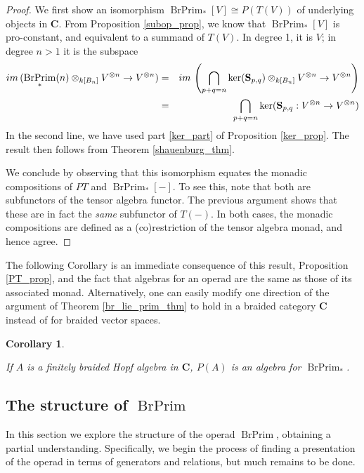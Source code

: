 \documentclass[12pt]{article}
\DeclareMathOperator{\BrPrim}{BrPrim}
\newcommand{\bC} {\mathbf{C}}
\newcommand{\bS} {\mathbf{S}}
\newcommand{\im}{{\rm im \,}}
\theoremstyle{plain}
\newtheorem{cor}[thm]{Corollary}
\theoremstyle{definition}
\theoremstyle{remark}
\begin{document}
\begin{proof}

We first show an isomorphism $\BrPrim_*[V] \cong P(T(V))$ of underlying objects in $\bC$.  From Proposition \ref{subop_prop}, we know that $\BrPrim_*[V]$ is pro-constant, and equivalent to a summand of $T(V)$.  In degree 1, it is $V$; in degree $n>1$ it is the subspace 
%
\begin{eqnarray*}
\im(\BrPrim_*(n) \otimes_{k[B_n]} V^{\otimes n} \to V^{\otimes n}) & = & \im \left(\bigcap_{p+q=n} \ker(\bS_{p,q}) \otimes_{k[B_n]} V^{\otimes n} \to V^{\otimes n}\right) \\
 & = & \bigcap_{p+q=n} \ker(\bS_{p,q}: V^{\otimes n} \to V^{\otimes n})
\end{eqnarray*}
%
In the second line, we have used part \ref{ker_part} of Proposition \ref{ker_prop}.  The result then follows from Theorem  \ref{shauenburg_thm}.

We conclude by observing that this isomorphism equates the monadic compositions of $PT$ and $\BrPrim_*[-]$.  To see this, note that both are subfunctors of the tensor algebra functor.  The previous argument shows that these are in fact the \emph{same} subfunctor of $T(-)$.  In both cases, the monadic compositions are defined as a (co)restriction of the tensor algebra monad, and hence agree. 

\end{proof} 

The following Corollary is an immediate consequence of this result, Proposition \ref{PT_prop}, and the fact that algebras for an operad are the same as those of its associated monad.  Alternatively, one can easily modify one direction of the argument of Theorem \ref{br_lie_prim_thm} to hold in a braided category $\bC$ instead of for braided vector spaces.

\begin{cor} \label{prim_alg_cor}

If $A$ is a finitely braided Hopf algebra in $\bC$, $P(A)$ is an algebra for $\BrPrim_*$.

\end{cor}

\subsection{The structure of $\BrPrim$} \label{brprim_structure_section}

In this section we explore the structure of the operad $\BrPrim$, obtaining a partial understanding.  Specifically, we begin the process of finding a presentation of the operad in terms of generators and relations, but much remains to be done.
\end{document}
